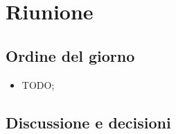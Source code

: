 \section{Riunione}
\subsection{Ordine del giorno}
\begin{itemize}
	\item TODO;
\end{itemize}

\subsection{Discussione e decisioni}
